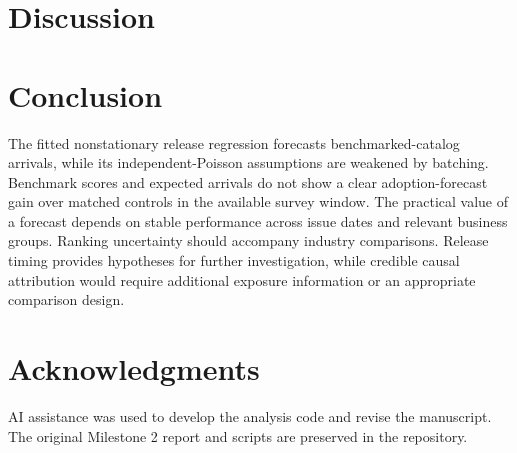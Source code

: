 \documentclass[11pt]{article}
\begin{document}





\section{Discussion}


\section{Conclusion}
\ConclusionResult{}
The fitted nonstationary release regression forecasts benchmarked-catalog arrivals, while its independent-Poisson assumptions are weakened by batching. Benchmark scores and expected arrivals do not show a clear adoption-forecast gain over matched controls in the available survey window.
The practical value of a forecast depends on stable performance across issue dates and relevant business groups. Ranking uncertainty should accompany industry comparisons. Release timing provides hypotheses for further investigation, while credible causal attribution would require additional exposure information or an appropriate comparison design.

\section*{Acknowledgments}
AI assistance was used to develop the analysis code and revise the manuscript. The original Milestone 2 report and scripts are preserved in the repository.
\end{document}

